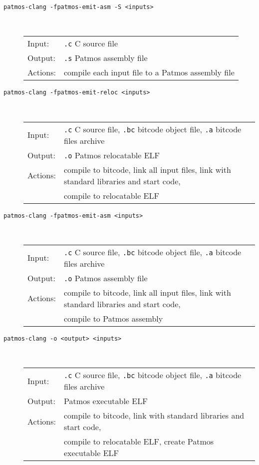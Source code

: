 \begin{description}
\item[\texttt{patmos-clang -fpatmos-emit-asm -S <inputs>}] \hfill\\
  \begin{tabular}{ll}
  Input:   & \texttt{.c} C source file \\
  Output:  & \texttt{.s} Patmos assembly file \\
  Actions: & compile each input file to a Patmos assembly file
  \end{tabular}

\item[\texttt{patmos-clang -fpatmos-emit-reloc <inputs>}] \hfill\\
  \begin{tabular}{ll}
  Input:   & \texttt{.c} C source file, \texttt{.bc} bitcode object file, \texttt{.a} bitcode files archive \\
  Output:  & \texttt{.o} Patmos relocatable ELF \\
  Actions: & compile to bitcode, link all input files, link with standard libraries and start code, \\
	   & compile to relocatable ELF
\end{tabular}

\item[\texttt{patmos-clang -fpatmos-emit-asm <inputs>}] \hfill\\
  \begin{tabular}{ll}
  Input:   & \texttt{.c} C source file, \texttt{.bc} bitcode object file, \texttt{.a} bitcode files archive \\
  Output:  & \texttt{.o} Patmos assembly file \\
  Actions: & compile to bitcode, link all input files, link with standard libraries and start code, \\
	   & compile to Patmos assembly
\end{tabular}

\item[\texttt{patmos-clang -o <output> <inputs>}] \hfill\\
  \begin{tabular}{ll}
  Input:   & \texttt{.c} C source file, \texttt{.bc} bitcode object file, \texttt{.a} bitcode files archive \\
  Output:  & Patmos executable ELF \\
  Actions: & compile to bitcode, link with standard libraries and start code, \\
           & compile to relocatable ELF, create Patmos executable ELF
  \end{tabular}

\end{description}

